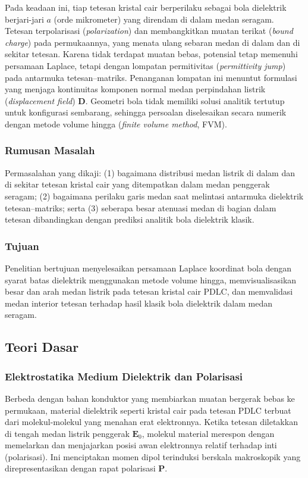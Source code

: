 \documentclass[11pt,a4paper]{article}
\begin{document}
Pada keadaan ini, tiap tetesan kristal cair berperilaku sebagai bola dielektrik berjari-jari $a$ (orde mikrometer) yang direndam di dalam medan seragam. Tetesan terpolarisasi (\textit{polarization}) dan membangkitkan muatan terikat (\textit{bound charge}) pada permukaannya, yang menata ulang sebaran medan di dalam dan di sekitar tetesan. Karena tidak terdapat muatan bebas, potensial tetap memenuhi persamaan Laplace, tetapi dengan lompatan permitivitas (\textit{permittivity jump}) pada antarmuka tetesan--matriks. Penanganan lompatan ini menuntut formulasi yang menjaga kontinuitas komponen normal medan perpindahan listrik (\textit{displacement field}) $\mathbf{D}$. Geometri bola tidak memiliki solusi analitik tertutup untuk konfigurasi sembarang, sehingga persoalan diselesaikan secara numerik dengan metode volume hingga (\textit{finite volume method}, FVM).

\subsubsection{Rumusan Masalah}
Permasalahan yang dikaji: (1) bagaimana distribusi medan listrik di dalam dan di sekitar tetesan kristal cair yang ditempatkan dalam medan penggerak seragam; (2) bagaimana perilaku garis medan saat melintasi antarmuka dielektrik tetesan--matriks; serta (3) seberapa besar atenuasi medan di bagian dalam tetesan dibandingkan dengan prediksi analitik bola dielektrik klasik.

\subsubsection{Tujuan}
Penelitian bertujuan menyelesaikan persamaan Laplace koordinat bola dengan syarat batas dielektrik menggunakan metode volume hingga, memvisualisasikan besar dan arah medan listrik pada tetesan kristal cair PDLC, dan memvalidasi medan interior tetesan terhadap hasil klasik bola dielektrik dalam medan seragam.

\subsection{Teori Dasar}

\subsubsection{Elektrostatika Medium Dielektrik dan Polarisasi}
Berbeda dengan bahan konduktor yang membiarkan muatan bergerak bebas ke permukaan, material dielektrik seperti kristal cair pada tetesan PDLC terbuat dari molekul-molekul yang menahan erat elektronnya. Ketika tetesan diletakkan di tengah medan listrik penggerak $\mathbf{E}_{0}$, molekul material merespon dengan memelarkan dan menjajarkan posisi awan elektronnya relatif terhadap inti (polarisasi). Ini menciptakan momen dipol terinduksi berskala makroskopik yang direpresentasikan dengan rapat polarisasi $\mathbf{P}$.
\end{document}
